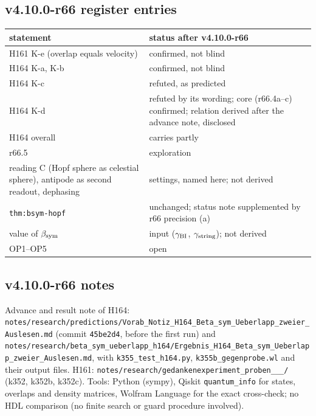 \subsection*{v4.10.0-r66 register entries}
\label{subsec:v4100-r66-register}

\begin{center}
\small
\begin{tabular}{@{}>{\raggedright\arraybackslash}p{}>{\raggedright\arraybackslash}p{}@{}}
\toprule
statement & status after v4.10.0-r66\\
\midrule
H161 K-e (overlap equals velocity) & confirmed, not blind\\
H164 K-a, K-b & confirmed, not blind\\
H164 K-c & refuted, as predicted\\
H164 K-d & refuted by its wording; core (r66.4a--c) confirmed; relation derived after the advance note, disclosed\\
H164 overall & carries partly\\
r66.5 & exploration\\
reading C (Hopf sphere as celestial sphere), antipode as second readout, dephasing & settings, named here; not derived\\
\texttt{thm:bsym-hopf} & unchanged; status note supplemented by r66 precision (a)\\
value of \(\beta_{\rm sym}\) & input (\(\gamma_{\rm BI}\), \(\gamma_{\rm string}\)); not derived\\
OP1--OP5 & open\\
\bottomrule
\end{tabular}
\end{center}

\subsection*{v4.10.0-r66 notes}
\label{subsec:v4100-r66-notes}

{\raggedright
Advance and result note of H164: \texttt{notes/\allowbreak research/\allowbreak predictions/\allowbreak Vorab\_\allowbreak Notiz\_\allowbreak H164\_\allowbreak Beta\_\allowbreak sym\_\allowbreak Ueberlapp\_\allowbreak zweier\_\allowbreak Auslesen.md}
(commit \texttt{45be2d4}, before the first run) and
\texttt{notes/\allowbreak research/\allowbreak beta\_\allowbreak sym\_\allowbreak ueberlapp\_\allowbreak h164/\allowbreak Ergebnis\_\allowbreak H164\_\allowbreak Beta\_\allowbreak sym\_\allowbreak Ueberlapp\_\allowbreak zweier\_\allowbreak Auslesen.md},
with \texttt{k355\_\allowbreak test\_\allowbreak h164.py}, \texttt{k355b\_\allowbreak gegenprobe.wl} and their output files.
H161: \texttt{notes/\allowbreak research/\allowbreak gedankenexperiment\_\allowbreak proben\_\_\_/} (k352, k352b, k352c).
Tools: Python (sympy), Qiskit \texttt{quantum\_info} for states, overlaps and density matrices, Wolfram Language for the exact cross-check; no HDL
comparison (no finite search or guard procedure involved).
\par}

